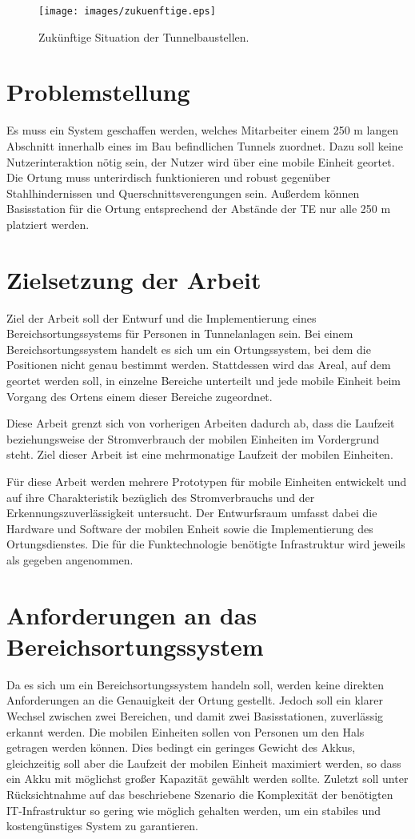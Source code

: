\begin{figure}[h]
  \centering
	\texttt{[image: images/zukuenftige.eps]}
  \caption{Zukünftige Situation der Tunnelbaustellen.}
  \label{fig:zukuenftige}
\end{figure}

\section{Problemstellung}
Es muss ein System geschaffen werden, welches Mitarbeiter einem 250 m langen Abschnitt innerhalb eines im Bau befindlichen Tunnels zuordnet.
Dazu soll keine Nutzerinteraktion nötig sein, der Nutzer wird über eine mobile Einheit geortet.
Die Ortung muss unterirdisch funktionieren und robust gegenüber Stahlhindernissen und Querschnittsverengungen sein.
Außerdem können Basisstation für die Ortung entsprechend der Abstände der TE nur alle 250 m platziert werden.


\section{Zielsetzung der Arbeit}
\label{ch:Einleitung:sec:Zielsetzung}
Ziel der Arbeit soll der Entwurf und die Implementierung eines Bereichsortungssystems für Personen in Tunnelanlagen sein.
Bei einem Bereichsortungssystem handelt es sich um ein Ortungssystem, bei dem die Positionen nicht genau bestimmt werden.
Stattdessen wird das Areal, auf dem geortet werden soll, in einzelne Bereiche unterteilt und jede mobile Einheit beim Vorgang des Ortens einem dieser Bereiche zugeordnet.

Diese Arbeit grenzt sich von vorherigen Arbeiten dadurch ab, dass die Laufzeit beziehungsweise der Stromverbrauch der mobilen Einheiten im Vordergrund steht.
Ziel dieser Arbeit ist eine mehrmonatige Laufzeit der mobilen Einheiten.

Für diese Arbeit werden mehrere Prototypen für mobile Einheiten entwickelt und auf ihre Charakteristik bezüglich des Stromverbrauchs und der Erkennungszuverlässigkeit untersucht.
Der Entwurfsraum umfasst dabei die Hardware und Software der mobilen Enheit sowie die Implementierung des Ortungsdienstes.
Die für die Funktechnologie benötigte Infrastruktur wird jeweils als gegeben angenommen.


\section{Anforderungen an das Bereichsortungssystem}
\label{ch:Einleitung:sec:Anforderungen}
Da es sich um ein Bereichsortungssystem handeln soll, werden keine direkten Anforderungen an die Genauigkeit der Ortung gestellt.
Jedoch soll ein klarer Wechsel zwischen zwei Bereichen, und damit zwei Basisstationen, zuverlässig erkannt werden.
Die mobilen Einheiten sollen von Personen um den Hals getragen werden können.
Dies bedingt ein geringes Gewicht des Akkus, gleichzeitig soll aber die Laufzeit der mobilen Einheit maximiert werden, so dass ein Akku mit möglichst großer Kapazität gewählt werden sollte.
Zuletzt soll unter Rücksichtnahme auf das beschriebene Szenario die Komplexität der benötigten IT-Infrastruktur so gering wie möglich gehalten werden, um ein stabiles und kostengünstiges System zu garantieren.


